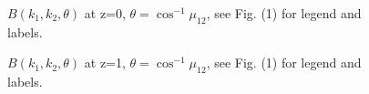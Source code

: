 \documentclass[]{mn2e}
\begin{document}
\begin{figure}
\caption{$B(k_1, k_2, \theta)$ at z=0, $\theta=\cos^{-1}\mu_{12}$,
see Fig. (1) for legend and labels.}
\end{figure}
\begin{figure}
\caption{$B(k_1, k_2, \theta)$ at z=1, $\theta=\cos^{-1}\mu_{12}$,
see Fig. (1) for legend and labels.}
\end{figure}

\end{document}
